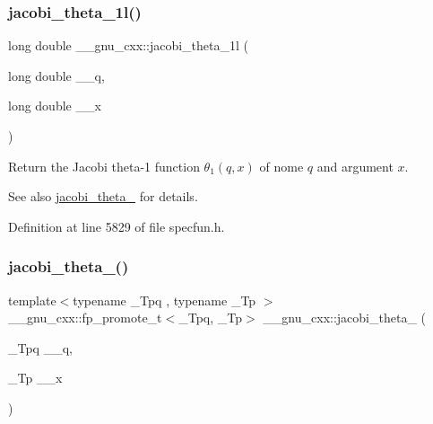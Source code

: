 \subsubsection{\texorpdfstring{jacobi\+\_\+theta\+\_\+1l()}{jacobi\_theta\_1l()}}
{\footnotesize\ttfamily long double \+\_\+\+\_\+gnu\+\_\+cxx\+::jacobi\+\_\+theta\+\_\+1l (\begin{DoxyParamCaption}\item[{long double}]{\+\_\+\+\_\+q,  }\item[{long double}]{\+\_\+\+\_\+x }\end{DoxyParamCaption})\hspace{0.3cm}{\ttfamily [inline]}}

Return the Jacobi theta-\/1 function $ \theta_1(q,x) $ of nome $ q $ and argument $ x $.

\begin{DoxySeeAlso}{See also}
\hyperlink{group__gnu__math__spec__func_ga996ca8c1fff75e2d4f196e99e0919933}{jacobi\+\_\+theta\+\_} for details. 
\end{DoxySeeAlso}


Definition at line 5829 of file specfun.\+h.

\mbox{\label{group__gnu__math__spec__func_gaf6b13dac1f112a870299d75cb4cf42cc}} 
\subsubsection{\texorpdfstring{jacobi\+\_\+theta\+\_()}{jacobi\_theta\_2()}}
{\footnotesize\ttfamily template$<$typename \+\_\+\+Tpq , typename \+\_\+\+Tp $>$ \\
\+\_\+\+\_\+gnu\+\_\+cxx\+::fp\+\_\+promote\+\_\+t$<$\+\_\+\+Tpq, \+\_\+\+Tp$>$ \+\_\+\+\_\+gnu\+\_\+cxx\+::jacobi\+\_\+theta\+\_ (\begin{DoxyParamCaption}\item[{\+\_\+\+Tpq}]{\+\_\+\+\_\+q,  }\item[{\+\_\+\+Tp}]{\+\_\+\+\_\+x }\end{DoxyParamCaption})\hspace{0.3cm}{\ttfamily [inline]}}

